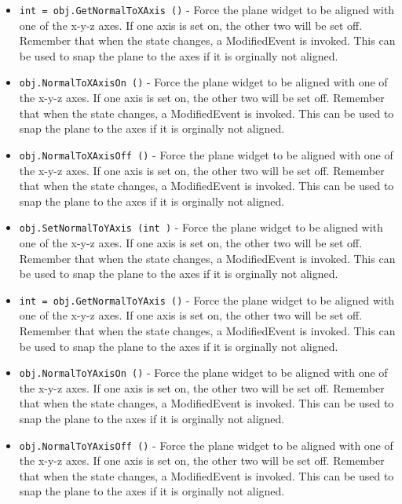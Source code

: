 \begin{itemize}
\item  \verb|int = obj.GetNormalToXAxis ()| -  Force the plane widget to be aligned with one of the x-y-z axes.
 If one axis is set on, the other two will be set off.
 Remember that when the state changes, a ModifiedEvent is invoked.
 This can be used to snap the plane to the axes if it is orginally
 not aligned.

\item  \verb|obj.NormalToXAxisOn ()| -  Force the plane widget to be aligned with one of the x-y-z axes.
 If one axis is set on, the other two will be set off.
 Remember that when the state changes, a ModifiedEvent is invoked.
 This can be used to snap the plane to the axes if it is orginally
 not aligned.

\item  \verb|obj.NormalToXAxisOff ()| -  Force the plane widget to be aligned with one of the x-y-z axes.
 If one axis is set on, the other two will be set off.
 Remember that when the state changes, a ModifiedEvent is invoked.
 This can be used to snap the plane to the axes if it is orginally
 not aligned.

\item  \verb|obj.SetNormalToYAxis (int )| -  Force the plane widget to be aligned with one of the x-y-z axes.
 If one axis is set on, the other two will be set off.
 Remember that when the state changes, a ModifiedEvent is invoked.
 This can be used to snap the plane to the axes if it is orginally
 not aligned.

\item  \verb|int = obj.GetNormalToYAxis ()| -  Force the plane widget to be aligned with one of the x-y-z axes.
 If one axis is set on, the other two will be set off.
 Remember that when the state changes, a ModifiedEvent is invoked.
 This can be used to snap the plane to the axes if it is orginally
 not aligned.

\item  \verb|obj.NormalToYAxisOn ()| -  Force the plane widget to be aligned with one of the x-y-z axes.
 If one axis is set on, the other two will be set off.
 Remember that when the state changes, a ModifiedEvent is invoked.
 This can be used to snap the plane to the axes if it is orginally
 not aligned.

\item  \verb|obj.NormalToYAxisOff ()| -  Force the plane widget to be aligned with one of the x-y-z axes.
 If one axis is set on, the other two will be set off.
 Remember that when the state changes, a ModifiedEvent is invoked.
 This can be used to snap the plane to the axes if it is orginally
 not aligned.


\end{itemize}
